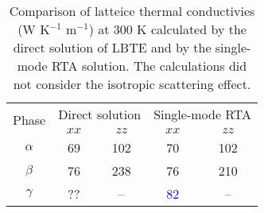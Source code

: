 \documentclass[twocolumn,amsmath,amssymb,a4paper,prb,superscriptaddress,floatfix]{revtex4-1}
\begin{document}
\begin{table}[ht]
	\caption{\label{table:direct} Comparison of latteice thermal conductivies (W K$^{-1}$ m$^{-1}$) at 300 K
			calculated by the direct solution of LBTE and by the  single-mode
		RTA solution. The calculations did not consider the isotropic scattering effect.}
 \begin{ruledtabular}
  \begin{tabular}{ccccc}
   \multirow{2}{*}{Phase}
   & \multicolumn{2}{c}{Direct solution} &
   \multicolumn{2}{c}{Single-mode RTA} \\
   \cline{2-5}
   & $xx$  & $zz$ & $xx$ & $zz$ \\
   \hline
   \multirow{1}{*}{$\alpha$}
   & 69 & 102 & 70 &  102 \\
   \multirow{1}{*}{$\beta$}
   & 76 & 238 & 76 &  210 \\
   \multirow{1}{*}{$\gamma$}
   & ?? & -- & \textcolor{blue}{82} &   -- \\
  \end{tabular}
 \end{ruledtabular}
\end{table}
\end{document}
